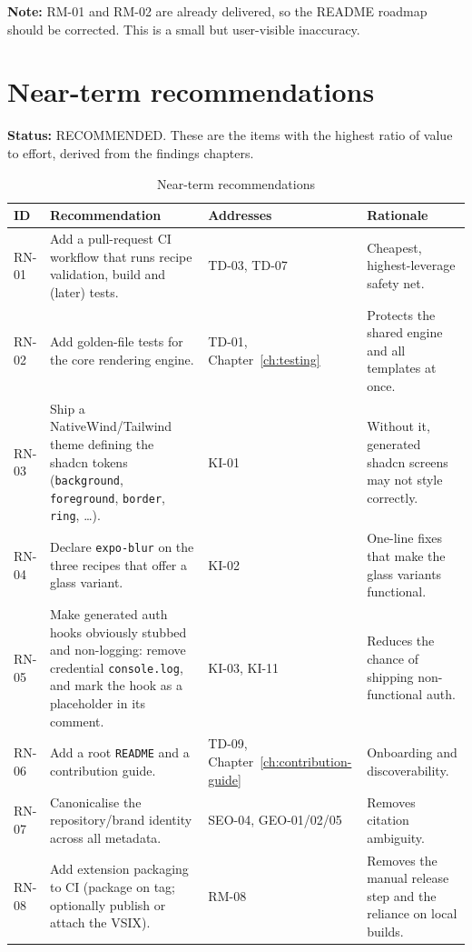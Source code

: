 \textbf{Note:} RM-01 and RM-02 are already delivered, so the README roadmap
should be corrected. This is a small but user-visible inaccuracy.

\section{Near-term recommendations}

\textbf{Status:} RECOMMENDED. These are the items with the highest ratio of
value to effort, derived from the findings chapters.

\begin{longtable}{p{1.4cm}p{5.2cm}p{3cm}p{4.8cm}}
\caption{Near-term recommendations}\\
\toprule
\textbf{ID} & \textbf{Recommendation} & \textbf{Addresses} & \textbf{Rationale} \\
\midrule

RN-01 & Add a pull-request CI workflow that runs recipe validation, build and
(later) tests. & TD-03, TD-07 & Cheapest, highest-leverage safety net. \\
RN-02 & Add golden-file tests for the core rendering engine. & TD-01, Chapter~\ref{ch:testing} &
Protects the shared engine and all templates at once. \\
RN-03 & Ship a NativeWind/Tailwind theme defining the shadcn tokens
(\texttt{background}, \texttt{foreground}, \texttt{border}, \texttt{ring},
\dots). & KI-01 & Without it, generated shadcn screens may not style correctly. \\
RN-04 & Declare \texttt{expo-blur} on the three recipes that offer a glass
variant. & KI-02 & One-line fixes that make the glass variants functional. \\
RN-05 & Make generated auth hooks obviously stubbed and non-logging: remove
credential \texttt{console.log}, and mark the hook as a placeholder in its
comment. & KI-03, KI-11 & Reduces the chance of shipping non-functional auth. \\
RN-06 & Add a root \texttt{README} and a contribution guide. & TD-09, Chapter~\ref{ch:contribution-guide} &
Onboarding and discoverability. \\
RN-07 & Canonicalise the repository/brand identity across all metadata. &
SEO-04, GEO-01/02/05 & Removes citation ambiguity. \\
RN-08 & Add extension packaging to CI (package on tag; optionally publish or
attach the VSIX). & RM-08 & Removes the manual release step and the reliance on
local builds. \\
\bottomrule
\end{longtable}

